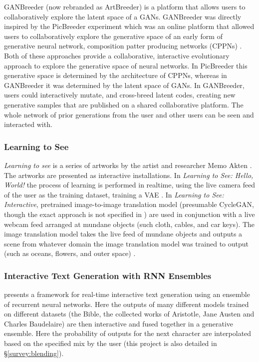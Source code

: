 GANBreeder (now rebranded as ArtBreeder) \citep{simon2020artbreeder} is a platform that allows users to collaboratively explore the latent space of a GANs.
GANBreeder was directly inspired by the PicBreeder experiment \citep{secretan2008picbreeder,secretan2011picbreeder} which was an online platform that allowed users to collaboratively explore the generative space of an early form of generative neural network, composition patter producing networks (CPPNs) \citep{stanley2007compositional}.
Both of these approaches provide a collaborative, interactive evolutionary approach to explore the generative space of neural networks. 
In PicBreeder this generative space is determined by the architecture of CPPNs, whereas in GANBreeder it was determined by the latent space of GANs.
In GANBreeder, users could interactively mutate, and cross-breed latent codes, creating new generative samples that are published on a shared collaborative platform.
The whole network of prior generations from the user and other users can be seen and interacted with.

\subsubsection{Learning to See}

\textit{Learning to see} is a series of artworks by the artist and researcher Memo Akten \citep{akten2019learning, celis2021memo}.
The artworks are presented as interactive installations.
In \textit{Learning to See: Hello, World!} the process of learning is performed in realtime, using the live camera feed of the user as the training dataset, training a VAE \citep{akten2017hello}.
In  \textit{Learning to See: Interactive}, pretrained image-to-image translation model (presumable CycleGAN, though the exact approach is not specified in \citep{akten2019learning}) are used in conjunction with a live webcam feed arranged at mundane objects (such cloth, cables, and car keys).
The image translation model takes the live feed of mundane objects and outputs a scene from whatever domain the image translation model was trained to output (such as oceans, flowers, and outer space) \citep{akten2017interactive}.

\subsubsection{Interactive Text Generation with RNN Ensembles}

\cite{akten2016real} presents a framework for real-time interactive text generation using an ensemble of recurrent neural networks. 
Here the outputs of many different models trained on different datasets (the Bible, the collected works of Aristotle, Jane Austen and Charles Baudelaire) are then interactive and fused together in a generative ensemble.
Here the probability of outputs for the next character are interpolated based on the specified mix by the user (this project is also detailed in \S \ref{survey:blending}).

